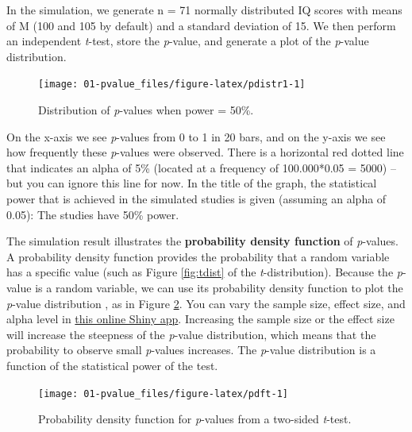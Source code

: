 \documentclass[
  oneside]{krantz}
\begin{document}
In the simulation, we generate n = 71 normally distributed IQ scores with means of M (100 and 105 by default) and a standard deviation of 15. We then perform an independent \emph{t}-test, store the \emph{p}-value, and generate a plot of the \emph{p}-value distribution.



\begin{figure}

{\centering \texttt{[image: 01-pvalue\_files/figure-latex/pdistr1-1]} 

}

\caption{Distribution of \emph{p}-values when power = 50\%.}\label{fig:pdistr1}
\end{figure}

On the x-axis we see \emph{p}-values from 0 to 1 in 20 bars, and on the y-axis we see how frequently these \emph{p}-values were observed. There is a horizontal red dotted line that indicates an alpha of 5\% (located at a frequency of 100.000*0.05 = 5000) -- but you can ignore this line for now. In the title of the graph, the statistical power that is achieved in the simulated studies is given (assuming an alpha of 0.05): The studies have 50\% power.

The simulation result illustrates the \textbf{probability density function} of \emph{p}-values. A probability density function provides the probability that a random variable has a specific value (such as Figure \ref{fig:tdist} of the \emph{t}-distribution). Because the \emph{p}-value is a random variable, we can use its probability density function to plot the \emph{p}-value distribution \citep{hung_behavior_1997, ulrich_properties_2018}, as in Figure \ref{fig:pdft}. You can vary the sample size, effect size, and alpha level in \href{http://shiny.ieis.tue.nl/d_p_power/}{this online Shiny app}. Increasing the sample size or the effect size will increase the steepness of the \emph{p}-value distribution, which means that the probability to observe small \emph{p}-values increases. The \emph{p}-value distribution is a function of the statistical power of the test.



\begin{figure}

{\centering \texttt{[image: 01-pvalue\_files/figure-latex/pdft-1]} 

}

\caption{Probability density function for \emph{p}-values from a two-sided \emph{t}-test.}\label{fig:pdft}
\end{figure}
\end{document}
